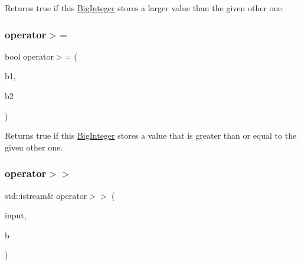 Returns true if this \mbox{\hyperlink{classBigInteger}{Big\+Integer}} stores a larger value than the given other one. 

\mbox{\label{classBigInteger_aac387c7e85293502096e25fe753e6490}} 
\subsubsection{\texorpdfstring{operator$>$=}{operator>=}}
{\footnotesize\ttfamily bool operator$>$= (\begin{DoxyParamCaption}\item[{const \mbox{\hyperlink{classBigInteger}{Big\+Integer}} \&}]{b1,  }\item[{const \mbox{\hyperlink{classBigInteger}{Big\+Integer}} \&}]{b2 }\end{DoxyParamCaption})\hspace{0.3cm}{\ttfamily [friend]}}



Returns true if this \mbox{\hyperlink{classBigInteger}{Big\+Integer}} stores a value that is greater than or equal to the given other one. 

\mbox{\label{classBigInteger_ab3c25317df8d1955db53a700f10e6edc}} 
\subsubsection{\texorpdfstring{operator$>$$>$}{operator>>}}
{\footnotesize\ttfamily std\+::istream\& operator$>$$>$ (\begin{DoxyParamCaption}\item[{std\+::istream \&}]{input,  }\item[{\mbox{\hyperlink{classBigInteger}{Big\+Integer}} \&}]{b }\end{DoxyParamCaption})\hspace{0.3cm}{\ttfamily [friend]}}

\mbox{\label{classBigInteger_a7a93a422d668c89ff99135bff3f3d6eb}} 
